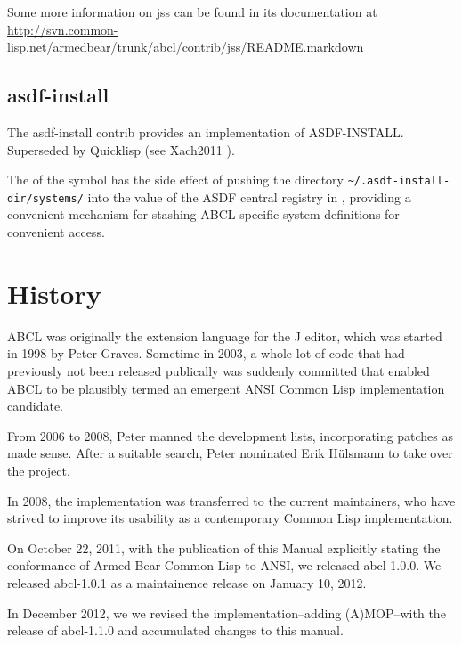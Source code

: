 \documentclass[10pt]{book}
\begin{document}
Some more information on jss can be found in its documentation at
\url{http://svn.common-lisp.net/armedbear/trunk/abcl/contrib/jss/README.markdown}

\section{asdf-install}

The asdf-install contrib provides an implementation of ASDF-INSTALL.
Superseded by Quicklisp (see Xach2011 \cite{quicklisp}).

The  of the  symbol has the side
effect of pushing the directory \verb+~/.asdf-install-dir/systems/+ into
the value of the \textsc{ASDF} central registry in
, providing a convenient mechanism for
stashing \textsc{ABCL} specific system definitions for convenient
access.

\chapter{History}

\textsc{ABCL} was originally the extension language for the J editor, which was
started in 1998 by Peter Graves.  Sometime in 2003, a whole lot of
code that had previously not been released publically was suddenly
committed that enabled ABCL to be plausibly termed an emergent ANSI
Common Lisp implementation candidate.

From 2006 to 2008, Peter manned the development lists, incorporating
patches as made sense.  After a suitable search, Peter nominated Erik
H\"{u}lsmann to take over the project.

In 2008, the implementation was transferred to the current
maintainers, who have strived to improve its usability as a
contemporary Common Lisp implementation.

On October 22, 2011, with the publication of this Manual explicitly
stating the conformance of Armed Bear Common Lisp to \textsc{ANSI}, we
released abcl-1.0.0.  We released abcl-1.0.1 as a maintainence release
on January 10, 2012.

In December 2012, we we revised the implementation--adding (A)MOP--with
the release of abcl-1.1.0 and accumulated changes to this manual.




\printindex
\end{document}
